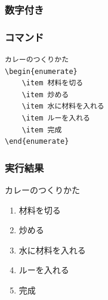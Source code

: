 \documentclass[a4j, titlepage]{jarticle}
\begin{document}
\subsubsection{数字付き}
\begin{multicols}{2}

\subsubsection*{コマンド}
\begin{lstlisting}
カレーのつくりかた
\begin{enumerate}
    \item 材料を切る
    \item 炒める
    \item 水に材料を入れる
    \item ルーを入れる
    \item 完成
\end{enumerate}
\end{lstlisting}

\vfill\null
\columnbreak

\subsubsection*{実行結果}
\begin{screen}

    カレーのつくりかた
    \begin{enumerate}
        \item 材料を切る
        \item 炒める
        \item 水に材料を入れる
        \item ルーを入れる
        \item 完成
    \end{enumerate}

\end{screen}
\end{multicols}
\end{document}
